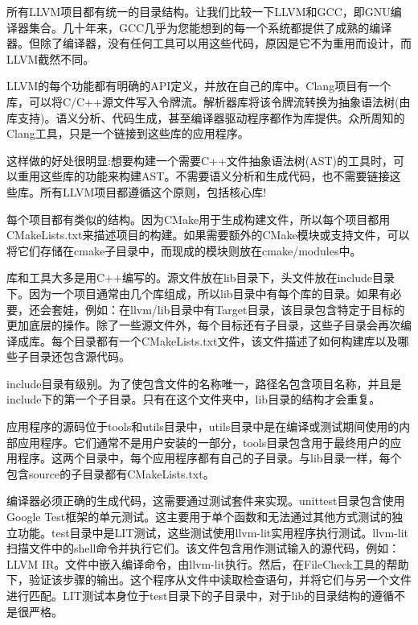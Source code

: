 所有LLVM项目都有统一的目录结构。让我们比较一下LLVM和GCC，即GNU编译器集合。几十年来，GCC几乎为您能想到的每一个系统都提供了成熟的编译器。但除了编译器，没有任何工具可以用这些代码，原因是它不为重用而设计，而LLVM截然不同。\par

LLVM的每个功能都有明确的API定义，并放在自己的库中。Clang项目有一个库，可以将C/C++源文件写入令牌流。解析器库将该令牌流转换为抽象语法树(由库支持)。语义分析、代码生成，甚至编译器驱动程序都作为库提供。众所周知的Clang工具，只是一个链接到这些库的应用程序。\par

这样做的好处很明显:想要构建一个需要C++文件抽象语法树(AST)的工具时，可以重用这些库的功能来构建AST。不需要语义分析和生成代码，也不需要链接这些库。所有LLVM项目都遵循这个原则，包括核心库!\par

每个项目都有类似的结构。因为CMake用于生成构建文件，所以每个项目都用CMakeLists.txt来描述项目的构建。如果需要额外的CMake模块或支持文件，可以将它们存储在cmake子目录中，而现成的模块则放在cmake/modules中。\par

库和工具大多是用C++编写的。源文件放在lib目录下，头文件放在include目录下。因为一个项目通常由几个库组成，所以lib目录中有每个库的目录。如果有必要，还会套娃，例如：在llvm/lib目录中有Target目录，该目录包含特定于目标的更加底层的操作。除了一些源文件外，每个目标还有子目录，这些子目录会再次编译成库。每个目录都有一个CMakeLists.txt文件，该文件描述了如何构建库以及哪些子目录还包含源代码。\par

include目录有级别。为了使包含文件的名称唯一，路径名包含项目名称，并且是include下的第一个子目录。只有在这个文件夹中，lib目录的结构才会重复。\par

应用程序的源码位于tools和utils目录中，utils目录中是在编译或测试期间使用的内部应用程序。它们通常不是用户安装的一部分，tools目录包含用于最终用户的应用程序。这两个目录中，每个应用程序都有自己的子目录。与lib目录一样，每个包含source的子目录都有CMakeLists.txt。\par

编译器必须正确的生成代码，这需要通过测试套件来实现。unittest目录包含使用Google Test框架的单元测试。这主要用于单个函数和无法通过其他方式测试的独立功能。test目录中是LIT测试，这些测试使用llvm-lit实用程序执行测试。llvm-lit扫描文件中的shell命令并执行它们。该文件包含用作测试输入的源代码，例如：LLVM IR。文件中嵌入编译命令，由llvm-lit执行。然后，在FileCheck工具的帮助下，验证该步骤的输出。这个程序从文件中读取检查语句，并将它们与另一个文件进行匹配。LIT测试本身位于test目录下的子目录中，对于lib的目录结构的遵循不是很严格。\par

